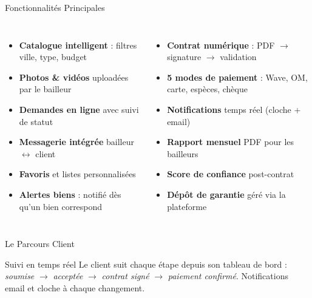 ﻿\documentclass[aspectratio=169,10pt]{beamer}
\newcommand{\kcbold}[1]{\textcolor{kcCoral}{\textbf{#1}}}
\begin{document}
\begin{frame}{Fonctionnalit\'{e}s Principales}
\begin{columns}[T]
\begin{itemize}
\item \kcbold{Catalogue intelligent} : filtres ville, type, budget
\item \kcbold{Photos \& vid\'{e}os} upload\'{e}es par le bailleur
\item \kcbold{Demandes en ligne} avec suivi de statut
\item \kcbold{Messagerie int\'{e}gr\'{e}e} bailleur $\leftrightarrow$ client
\item \kcbold{Favoris} et listes personnalis\'{e}es
\item \kcbold{Alertes biens} : notifi\'{e} d\`{e}s qu'un bien correspond
\end{itemize}
\begin{itemize}
\item \kcbold{Contrat num\'{e}rique} : PDF $\rightarrow$ signature $\rightarrow$ validation
\item \kcbold{5 modes de paiement} : Wave, OM, carte, esp\`{e}ces, ch\`{e}que
\item \kcbold{Notifications} temps r\'{e}el (cloche + email)
\item \kcbold{Rapport mensuel} PDF pour les bailleurs
\item \kcbold{Score de confiance} post-contrat
\item \kcbold{D\'{e}p\^{o}t de garantie} g\'{e}r\'{e} via la plateforme
\end{itemize}
\end{columns}
\end{frame}

\begin{frame}{Le Parcours Client}
\begin{center}
\end{center}
\vspace{0.3cm}
\begin{block}{Suivi en temps r\'{e}el}
Le client suit chaque \'{e}tape depuis son tableau de bord : \textit{soumise} $\rightarrow$ \textit{accept\'{e}e} $\rightarrow$ \textit{contrat sign\'{e}} $\rightarrow$ \textit{paiement confirm\'{e}}. Notifications email et cloche \`{a} chaque changement.
\end{block}
\end{frame}
\end{document}
